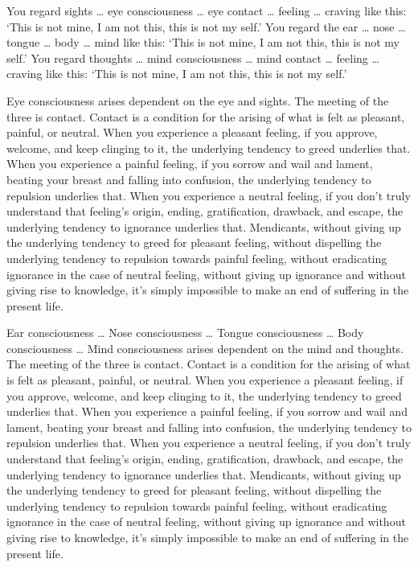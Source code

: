 \documentclass[12pt,openany]{book}%
\begin{document}
You regard sights … eye consciousness … eye contact … feeling … craving like this: ‘This is not mine, I am not this, this is not my self.’ You regard the ear … nose … tongue … body … mind like this: ‘This is not mine, I am not this, this is not my self.’ You regard thoughts … mind consciousness … mind contact … feeling … craving like this: ‘This is not mine, I am not this, this is not my self.’ 

Eye consciousness arises dependent on the eye and sights. The meeting of the three is contact. Contact is a condition for the arising of what is felt as pleasant, painful, or neutral. When you experience a pleasant feeling, if you approve, welcome, and keep clinging to it, the underlying tendency to greed underlies that. When you experience a painful feeling, if you sorrow and wail and lament, beating your breast and falling into confusion, the underlying tendency to repulsion underlies that. When you experience a neutral feeling, if you don’t truly understand that feeling’s origin, ending, gratification, drawback, and escape, the underlying tendency to ignorance underlies that. Mendicants, without giving up the underlying tendency to greed for pleasant feeling, without dispelling the underlying tendency to repulsion towards painful feeling, without eradicating ignorance in the case of neutral feeling, without giving up ignorance and without giving rise to knowledge, it’s simply impossible to make an end of suffering in the present life. 

Ear consciousness … Nose consciousness … Tongue consciousness … Body consciousness … Mind consciousness arises dependent on the mind and thoughts. The meeting of the three is contact. Contact is a condition for the arising of what is felt as pleasant, painful, or neutral. When you experience a pleasant feeling, if you approve, welcome, and keep clinging to it, the underlying tendency to greed underlies that. When you experience a painful feeling, if you sorrow and wail and lament, beating your breast and falling into confusion, the underlying tendency to repulsion underlies that. When you experience a neutral feeling, if you don’t truly understand that feeling’s origin, ending, gratification, drawback, and escape, the underlying tendency to ignorance underlies that. Mendicants, without giving up the underlying tendency to greed for pleasant feeling, without dispelling the underlying tendency to repulsion towards painful feeling, without eradicating ignorance in the case of neutral feeling, without giving up ignorance and without giving rise to knowledge, it’s simply impossible to make an end of suffering in the present life. 
\end{document}
